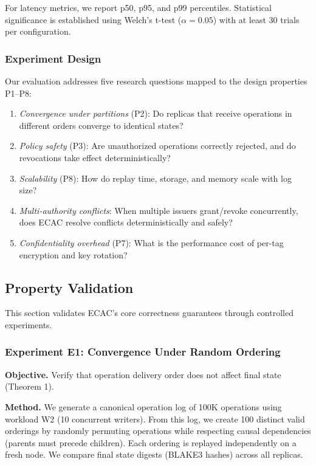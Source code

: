 For latency metrics, we report p50, p95, and p99 percentiles. Statistical significance is established using Welch's t-test ($\alpha = 0.05$) with at least 30 trials per configuration.

\subsubsection{Experiment Design}
Our evaluation addresses five research questions mapped to the design properties P1--P8:

\begin{enumerate}[label=\textbf{RQ\arabic*},leftmargin=2.5em]
    \item \textit{Convergence under partitions} (P2): Do replicas that receive operations in different orders converge to identical states?
    \item \textit{Policy safety} (P3): Are unauthorized operations correctly rejected, and do revocations take effect deterministically?
    \item \textit{Scalability} (P8): How do replay time, storage, and memory scale with log size?
    \item \textit{Multi-authority conflicts}: When multiple issuers grant/revoke concurrently, does ECAC resolve conflicts deterministically and safely?
    \item \textit{Confidentiality overhead} (P7): What is the performance cost of per-tag encryption and key rotation?
\end{enumerate}

\subsection{Property Validation}\label{subsec:property-validation}

This section validates ECAC's core correctness guarantees through controlled experiments.

\subsubsection{Experiment E1: Convergence Under Random Ordering}
\textbf{Objective.} Verify that operation delivery order does not affect final state (Theorem 1).

\textbf{Method.} We generate a canonical operation log of 100K operations using workload W2 (10 concurrent writers). From this log, we create 100 distinct valid orderings by randomly permuting operations while respecting causal dependencies (parents must precede children). Each ordering is replayed independently on a fresh node. We compare final state digests (BLAKE3 hashes) across all replicas.

